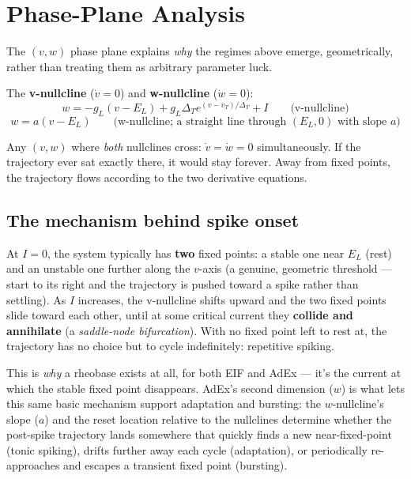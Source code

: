 \documentclass[11pt,a4paper]{article}
\begin{document}
\section{Phase-Plane Analysis}
The $(v,w)$ phase plane explains \emph{why} the regimes above emerge, geometrically, rather than treating them as arbitrary parameter luck.

\begin{defbox}[Nullclines]
The \textbf{v-nullcline} ($\dot v = 0$) and \textbf{w-nullcline} ($\dot w = 0$):
$$w = -g_L(v-E_L) + g_L\Delta_T e^{(v-v_T)/\Delta_T} + I \qquad\text{(v-nullcline)}$$
$$w = a(v - E_L) \qquad\text{(w-nullcline; a straight line through } (E_L, 0) \text{ with slope } a\text{)}$$
\end{defbox}

\begin{defbox}
Any $(v,w)$ where \emph{both} nullclines cross: $\dot v = \dot w = 0$ simultaneously. If the trajectory ever sat exactly there, it would stay forever. Away from fixed points, the trajectory flows according to the two derivative equations.
\end{defbox}

\subsection{The mechanism behind spike onset}
At $I=0$, the system typically has \textbf{two} fixed points: a stable one near $E_L$ (rest) and an unstable one further along the $v$-axis (a genuine, geometric threshold — start to its right and the trajectory is pushed toward a spike rather than settling). As $I$ increases, the v-nullcline shifts upward and the two fixed points slide toward each other, until at some critical current they \textbf{collide and annihilate} (a \emph{saddle-node bifurcation}). With no fixed point left to rest at, the trajectory has no choice but to cycle indefinitely: repetitive spiking.

\begin{keybox}
This is \emph{why} a rheobase exists at all, for both EIF and AdEx — it's the current at which the stable fixed point disappears. AdEx's second dimension ($w$) is what lets this same basic mechanism support adaptation and bursting: the $w$-nullcline's slope ($a$) and the reset location relative to the nullclines determine whether the post-spike trajectory lands somewhere that quickly finds a new near-fixed-point (tonic spiking), drifts further away each cycle (adaptation), or periodically re-approaches and escapes a transient fixed point (bursting).
\end{keybox}
\end{document}

